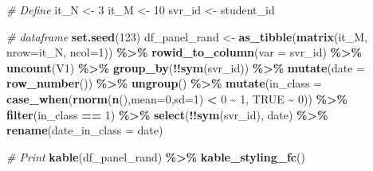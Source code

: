 \documentclass[
]{book}
\newenvironment{Shaded}{\begin{snugshade}}{\end{snugshade}}
\newcommand{\CommentTok}[1]{\textcolor[rgb]{0.56,0.35,0.01}{\textit{#1}}}
\newcommand{\DataTypeTok}[1]{\textcolor[rgb]{0.13,0.29,0.53}{#1}}
\newcommand{\DecValTok}[1]{\textcolor[rgb]{0.00,0.00,0.81}{#1}}
\newcommand{\KeywordTok}[1]{\textcolor[rgb]{0.13,0.29,0.53}{\textbf{#1}}}
\newcommand{\NormalTok}[1]{#1}
\newcommand{\OperatorTok}[1]{\textcolor[rgb]{0.81,0.36,0.00}{\textbf{#1}}}
\newcommand{\OtherTok}[1]{\textcolor[rgb]{0.56,0.35,0.01}{#1}}
\newcommand{\StringTok}[1]{\textcolor[rgb]{0.31,0.60,0.02}{#1}}
\begin{document}
\begin{Shaded}
\begin{Highlighting}[]
\CommentTok{\# Define}
\NormalTok{it\_N \textless{}{-}}\StringTok{ }\DecValTok{3}
\NormalTok{it\_M \textless{}{-}}\StringTok{ }\DecValTok{10}
\NormalTok{svr\_id \textless{}{-}}\StringTok{ \textquotesingle{}student\_id\textquotesingle{}}

\CommentTok{\# dataframe}
\KeywordTok{set.seed}\NormalTok{(}\DecValTok{123}\NormalTok{)}
\NormalTok{df\_panel\_rand \textless{}{-}}\StringTok{ }\KeywordTok{as\_tibble}\NormalTok{(}\KeywordTok{matrix}\NormalTok{(it\_M, }\DataTypeTok{nrow=}\NormalTok{it\_N, }\DataTypeTok{ncol=}\DecValTok{1}\NormalTok{)) }\OperatorTok{\%\textgreater{}\%}
\StringTok{  }\KeywordTok{rowid\_to\_column}\NormalTok{(}\DataTypeTok{var =}\NormalTok{ svr\_id) }\OperatorTok{\%\textgreater{}\%}
\StringTok{  }\KeywordTok{uncount}\NormalTok{(V1) }\OperatorTok{\%\textgreater{}\%}
\StringTok{  }\KeywordTok{group\_by}\NormalTok{(}\OperatorTok{!!}\KeywordTok{sym}\NormalTok{(svr\_id)) }\OperatorTok{\%\textgreater{}\%}\StringTok{ }\KeywordTok{mutate}\NormalTok{(}\DataTypeTok{date =} \KeywordTok{row\_number}\NormalTok{()) }\OperatorTok{\%\textgreater{}\%}
\StringTok{  }\KeywordTok{ungroup}\NormalTok{() }\OperatorTok{\%\textgreater{}\%}\StringTok{ }\KeywordTok{mutate}\NormalTok{(}\DataTypeTok{in\_class =} \KeywordTok{case\_when}\NormalTok{(}\KeywordTok{rnorm}\NormalTok{(}\KeywordTok{n}\NormalTok{(),}\DataTypeTok{mean=}\DecValTok{0}\NormalTok{,}\DataTypeTok{sd=}\DecValTok{1}\NormalTok{) }\OperatorTok{\textless{}}\StringTok{ }\DecValTok{0} \OperatorTok{\textasciitilde{}}\StringTok{ }\DecValTok{1}\NormalTok{, }\OtherTok{TRUE} \OperatorTok{\textasciitilde{}}\StringTok{ }\DecValTok{0}\NormalTok{)) }\OperatorTok{\%\textgreater{}\%}
\StringTok{  }\KeywordTok{filter}\NormalTok{(in\_class }\OperatorTok{==}\StringTok{ }\DecValTok{1}\NormalTok{) }\OperatorTok{\%\textgreater{}\%}\StringTok{ }\KeywordTok{select}\NormalTok{(}\OperatorTok{!!}\KeywordTok{sym}\NormalTok{(svr\_id), date) }\OperatorTok{\%\textgreater{}\%}
\StringTok{  }\KeywordTok{rename}\NormalTok{(}\DataTypeTok{date\_in\_class =}\NormalTok{ date)}

\CommentTok{\# Print}
\KeywordTok{kable}\NormalTok{(df\_panel\_rand) }\OperatorTok{\%\textgreater{}\%}\StringTok{ }\KeywordTok{kable\_styling\_fc}\NormalTok{()}
\end{Highlighting}
\end{Shaded}
\end{document}
